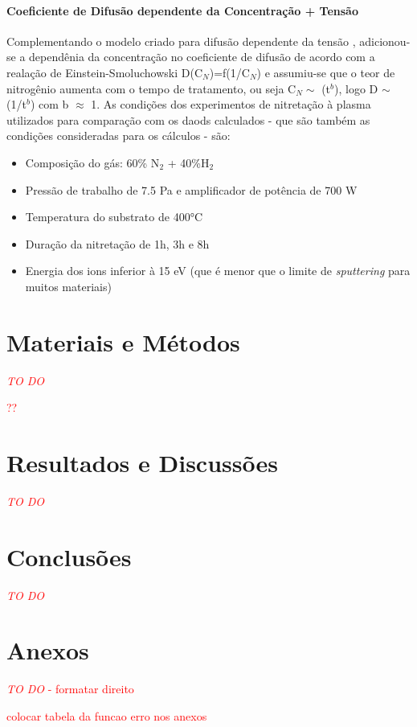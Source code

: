 \documentclass[]{politex}
\newcommand\myworries[1]{\textcolor{red}{#1}}
\begin{document}
\subsubsection{Coeficiente de Difusão dependente da Concentração + Tensão}
\label{sec:comb-depc-stress}
	Complementando o modelo criado para difusão dependente da tensão \cite{galdikas2010stress}, adicionou-se a dependênia da concentração no coeficiente de difusão de acordo com a realação de Einstein-Smoluchowski D(C$_N$)=f(1/C$_N$) \cite{moskalioviene2012stress} e assumiu-se que o teor de nitrogênio aumenta com o tempo de tratamento, ou seja C$_N\sim$ (t$^b$), logo D $\sim$ (1/t$^b$) com b $\approx$ 1.
	As condições dos experimentos de nitretação à plasma utilizados para comparação com os daods calculados - que são também as condições consideradas para os cálculos - são: 
	\begin{itemize}
	 \item Composição do gás: 60\% N$_2$ + 40\%H$_2$
	 \item Pressão de trabalho de 7.5 Pa e amplificador de potência de 700 W
	 \item Temperatura do substrato de 400°C
	 \item Duração da nitretação de 1h, 3h e 8h
  	 \item Energia dos ions inferior à 15 eV (que é menor que o limite de \textit{sputtering} para muitos materiais)
	\end{itemize}
	

\chapter{Materiais e Métodos}
\myworries{\textit{TO DO}}

\myworries{??}

\chapter{Resultados e Discussões}
\myworries{\textit{TO DO}}

\chapter{Conclusões}
\myworries{\textit{TO DO}}






\chapter{Anexos}
\myworries{\textit{TO DO} - formatar direito}
\par
\myworries{colocar tabela da funcao erro nos anexos}
\end{document}
